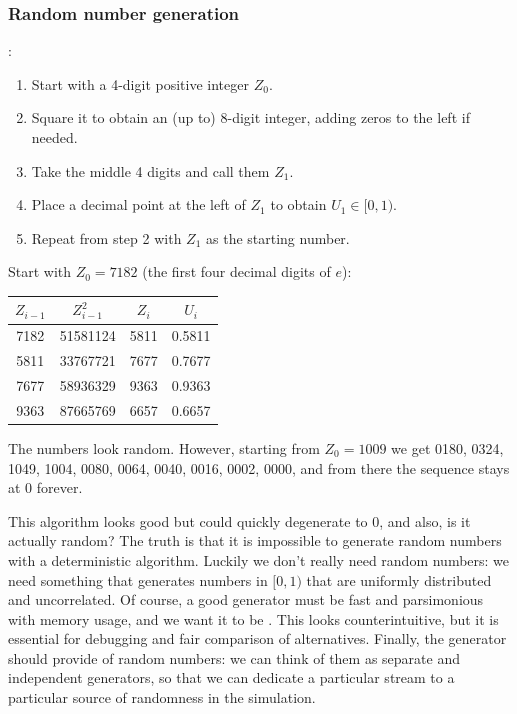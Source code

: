 \subsubsection{Random number generation}
:
\begin{enumerate}
\item Start with a 4-digit positive integer $Z_0$.
\item Square it to obtain an (up to) 8-digit integer, adding zeros to the left if needed.
\item Take the middle 4 digits and call them $Z_1$.
\item Place a decimal point at the left of $Z_1$ to obtain $U_1 \in [0,1)$.
\item Repeat from step 2 with $Z_1$ as the starting number.
\end{enumerate}

\begin{example}
Start with $Z_0 = 7182$ (the first four decimal digits of $e$):
\begin{center}
\begin{tabular}{cccc}
\toprule
$Z_{i-1}$ & $Z_{i-1}^2$ & $Z_i$ & $U_i$ \\
\midrule
7182 & 51581124 & 5811 & 0.5811 \\
5811 & 33767721 & 7677 & 0.7677 \\
7677 & 58936329 & 9363 & 0.9363 \\
9363 & 87665769 & 6657 & 0.6657 \\
\bottomrule
\end{tabular}
\end{center}
The numbers look random. However, starting from $Z_0 = 1009$ we get 0180, 0324, 1049, 1004, 0080, 0064, 0040, 0016, 0002, 0000, and from there the sequence stays at $0$ forever.
\end{example}

This algorithm looks good but could quickly degenerate to 0, and also, is it actually random? The truth is that it is impossible to generate random numbers with a deterministic algorithm. Luckily we don't really need random numbers: we need something that generates numbers in $[0,1)$ that are uniformly distributed and uncorrelated. Of course, a good generator must be fast and parsimonious with memory usage, and we want it to be . This looks counterintuitive, but it is essential for debugging and fair comparison of alternatives. Finally, the generator should provide  of random numbers: we can think of them as separate and independent generators, so that we can dedicate a particular stream to a particular source of randomness in the simulation.

